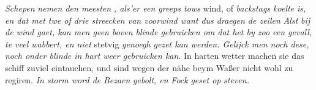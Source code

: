 \pend 
\clearpage 
\pstart \textit{Schepen}\protect{}\textit{ nemen den meesten }\protect{}\textit{, als'er een greeps tows} wind, of \textit{back\-stags koelte is, en dat met twe of drie streecken van voorwind }\textit{ want dus draegen de zeilen}\protect{} 
\pend 
\pstart \textit{Alst} \textit{bij de wind gaet, kan men geen boven blinde gebruicken om dat het by zoo een gevall, te veel wabbert, en niet} stetvig \textit{genoegh gezet kan werden. Gelijck men noch dese, noch onder blinde in hart weer gebruicken kan}. In harten wetter machen sie das schiff\protect{} zuviel eintauchen, und sind wegen der n\"{a}he beym Waßer nicht wohl zu regiren. 
\pend 
\pstart \textit{In storm word de }\textit{Bezaen}\protect{}\textit{ gebolt, en }\textit{Fock}\protect{}\textit{ geset op }\textit{steven}\protect{}\textit{.} 
\pend 
